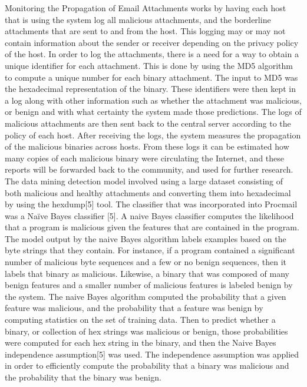 \documentclass[11pt]{article}
\begin{document}
		Monitoring the Propagation of Email Attachments works by having each host that is using the system log all malicious attachments, and the borderline attachments that are sent to and from the host. This logging may or may not contain information about the sender or receiver depending on the privacy policy of the host. In order to log the attachments, there is a need for a way to obtain a unique identifier for each attachment. This is done by using the MD5 algorithm to compute a unique number for each binary attachment. The input to MD5 was the hexadecimal representation of the binary. These identifiers were then kept in a log along with other information such as whether the attachment was malicious, or benign and with what certainty the system made those predictions. The logs of malicious attachments are then sent back to the central server according to the policy of each host. After receiving the logs, the system measures the propagation of the malicious binaries across hosts. From these logs it can be estimated how many copies of each malicious binary were circulating the Internet, and these reports will be forwarded back to the community, and used for further research.
		The data mining detection model involved using a large dataset consisting of both malicious and healthy attachments and converting them into hexadecimal by using the hexdump[5] tool.
		The classifier that was incorporated into Procmail was a Naïve Bayes classifier [5]. A naive Bayes classifier computes the likelihood that a program is malicious given the features that are contained in the program. The model output by the naive Bayes algorithm labels examples based on the byte strings that they contain. For instance, if a program contained a significant number of malicious byte sequences and a few or no benign sequences, then it labels that binary as malicious. Likewise, a binary that was composed of many benign features and a smaller number of malicious features is labeled benign by the system. The naive Bayes algorithm computed the probability that a given feature was malicious, and the probability that a feature was benign by computing statistics on the set of training data. Then to predict whether a binary, or collection of hex strings was malicious or benign, those probabilities were computed for each hex string in the binary, and then the Naive Bayes independence assumption[5] was used. The independence assumption was applied in order to efficiently compute the probability that a binary was malicious and the probability that the binary was benign.
\end{document}
